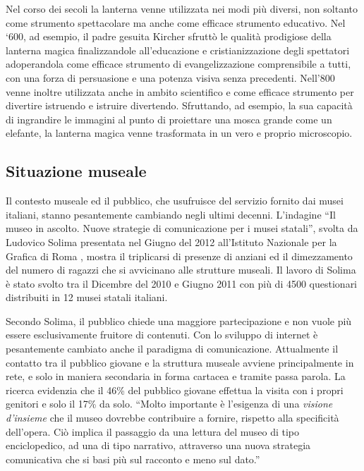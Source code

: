 \begin{itemize}
	Nel corso dei secoli la lanterna venne utilizzata nei modi più diversi, non soltanto come strumento spettacolare ma anche come efficace strumento educativo. Nel ‘600, ad esempio, il padre gesuita Kircher sfruttò le qualità prodigiose della lanterna magica finalizzandole all’educazione e cristianizzazione degli spettatori adoperandola come efficace strumento di evangelizzazione comprensibile a tutti, con una forza di persuasione e una potenza visiva senza precedenti. Nell’800 venne inoltre utilizzata anche in ambito scientifico e come efficace strumento per divertire istruendo e istruire divertendo. Sfruttando, ad esempio, la sua capacità di ingrandire le immagini al punto di proiettare una mosca grande come un elefante, la lanterna magica venne trasformata in un vero e proprio microscopio.
	
\end{itemize}

\subsection{Situazione museale}
\label{sec:situazione_museale}

Il contesto museale ed il pubblico, che usufruisce del servizio fornito dai musei italiani, stanno pesantemente cambiando negli ultimi decenni.
L’indagine “Il museo in ascolto. Nuove strategie di comunicazione per i musei statali”, svolta da Ludovico Solima presentata nel Giugno del 2012 all’Istituto Nazionale per la Grafica di Roma \cite{MuseoInAscolto}, mostra il triplicarsi di presenze di anziani ed il dimezzamento del numero di ragazzi che si avvicinano alle strutture museali.
Il lavoro di Solima è stato svolto tra il Dicembre del 2010 e Giugno 2011 con più di 4500 questionari distribuiti in 12 musei statali italiani.

Secondo Solima, il pubblico chiede una maggiore partecipazione e non vuole più essere esclusivamente fruitore di contenuti. Con lo sviluppo di internet è pesantemente cambiato anche il paradigma di comunicazione. Attualmente il contatto tra il pubblico giovane e la struttura museale avviene principalmente in rete, e solo in maniera secondaria in forma cartacea e tramite passa parola.
La ricerca evidenzia che il 46\% del pubblico giovane effettua la visita con i propri genitori e solo il 17\% da solo. “Molto importante è l'esigenza di una \textit{visione d'insieme} che il museo dovrebbe contribuire a fornire, rispetto alla specificità dell'opera. Ciò implica il passaggio da una lettura del museo di tipo enciclopedico, ad una di tipo narrativo, attraverso una nuova strategia comunicativa che si basi più sul racconto e meno sul dato.”

